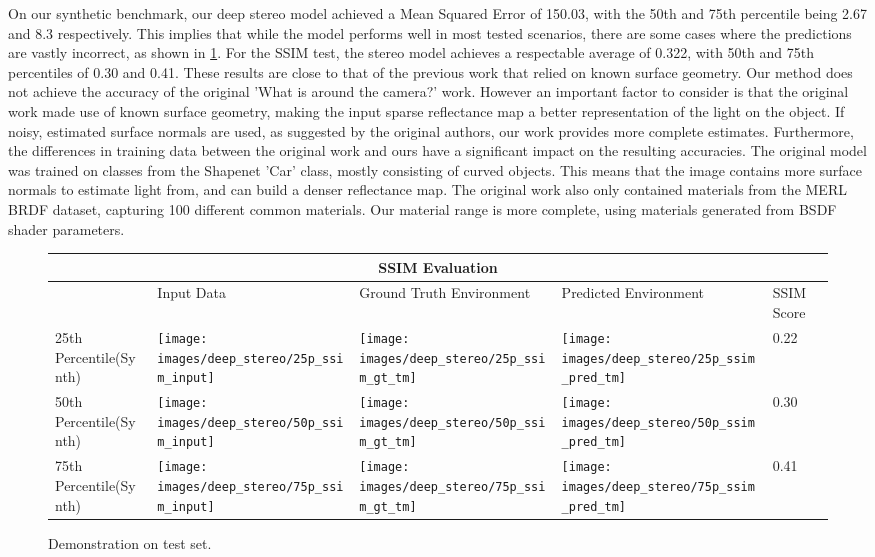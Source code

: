 \documentclass[ %
                    author={Gavin Parker},
                supervisor={Dr. Neill Campbell},
                    degree={MEng},
                     title={Deep Siamese Networks for Illumination Estimation from Stereo Images},
                  subtitle={},
                      type={research},
                      year={2018} ]{dissertation}
\begin{document}
\newline
On our synthetic benchmark, our deep stereo model achieved a Mean Squared Error of 150.03, with the 50th and 75th percentile being 2.67 and 8.3 respectively. This implies that while the model performs well in most tested scenarios, there are some cases where the predictions are vastly incorrect, as shown in \ref{ssim_results}. For the SSIM test, the stereo model achieves a respectable average of 0.322, with 50th and 75th percentiles of 0.30 and 0.41. These results are close to that of the previous work that relied on known surface geometry.
\newline
Our method does not achieve the accuracy of the original 'What is around the camera?' work. However an important factor to consider is that the original work made use of known surface geometry, making the input sparse reflectance map a better representation of the light on the object. If noisy, estimated surface normals are used, as suggested by the original authors, our work provides more complete estimates. Furthermore, the differences in training data between the original work and ours have a significant impact on the resulting accuracies. The original model was trained on classes from the Shapenet 'Car' class, mostly consisting of curved objects. This means that the image contains more surface normals to estimate light from, and can build a denser reflectance map. The original work also only contained materials from the MERL BRDF dataset, capturing 100 different common materials. Our material range is more complete, using materials generated from BSDF shader parameters.
\begin{figure}
\centering
\begin{tabular}{ |p{3cm}||p{3cm}|p{3cm}|p{3cm}|p{3cm}|  }
 \hline
 \multicolumn{5}{|c|}{SSIM Evaluation} \\
 \hline
  & Input Data &Ground Truth Environment&Predicted Environment&SSIM Score\\
 \hline
 25th Percentile(Synth)&\parbox[c]{1em}{
 \texttt{[image: images/deep\_stereo/25p\_ssim\_input]}}&\parbox[c]{1em}{\texttt{[image: images/deep\_stereo/25p\_ssim\_gt\_tm]}}&
\parbox[c]{1em}{\texttt{[image: images/deep\_stereo/25p\_ssim\_pred\_tm]}}& 0.22\\
 50th Percentile(Synth)&\parbox[c]{1em}{
 \texttt{[image: images/deep\_stereo/50p\_ssim\_input]}}&\parbox[c]{1em}{\texttt{[image: images/deep\_stereo/50p\_ssim\_gt\_tm]}}&
\parbox[c]{1em}{\texttt{[image: images/deep\_stereo/50p\_ssim\_pred\_tm]}}& 0.30\\
 75th Percentile(Synth)&\parbox[c]{1em}{
 \texttt{[image: images/deep\_stereo/75p\_ssim\_input]}}&\parbox[c]{1em}{\texttt{[image: images/deep\_stereo/75p\_ssim\_gt\_tm]}}&
\parbox[c]{1em}{\texttt{[image: images/deep\_stereo/75p\_ssim\_pred\_tm]}}& 0.41\\

 \hline
\end{tabular}

\label{ssim_results}
\caption{Demonstration on test set.}

\end{figure}
\end{document}
